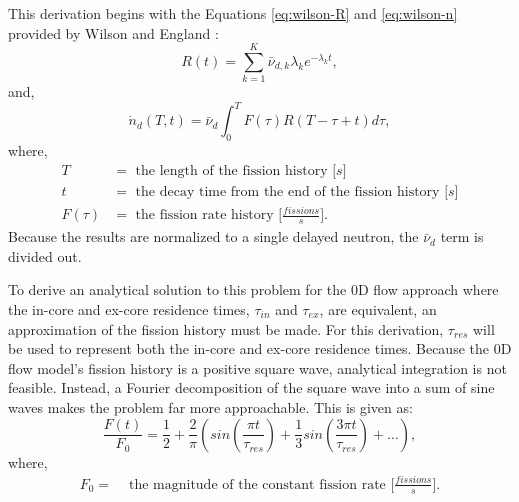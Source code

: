 \renewcommand{\theequation}{A\thechapter.\arabic{equation}}
\label{ref:appendixA}

This derivation begins with the Equations \eqref{eq:wilson-R} and \eqref{eq:wilson-n} provided by Wilson and England \cite{wilson2002delayed}:
\begin{equation}
    R(t) = \sum_{k=1}^{K} \bar{\nu}_{d, k} \lambda_k e^{-\lambda_k t},
    \label{eq:wilson-R}
\end{equation}
and,
\begin{equation}
    \dot{n}_d(T, t) = \bar{\nu}_d \int_{0}^{T} F(\tau) R(T-\tau+t) d\tau,
    \label{eq:wilson-n}
\end{equation}
where,
\begin{align}
T &= \mbox{ the length of the fission history [$s$]} \nonumber \\
t &= \mbox{ the decay time from the end of the fission history [$s$]} \nonumber \\
F(\tau) &= \mbox{ the fission rate history [$\frac{fissions}{s}$].} \nonumber
\end{align}
Because the results are normalized to a single delayed neutron, the $\bar{\nu}_d$ term is divided out.

To derive an analytical solution to this problem for the 0D flow approach where the in-core and ex-core residence times, $\tau_{in}$ and $\tau_{ex}$, are equivalent, an approximation of the fission history must be made.
For this derivation, $\tau_{res}$ will be used to represent both the in-core and ex-core residence times.
Because the 0D flow model's fission history is a positive square wave, analytical integration is not feasible.
Instead, a Fourier decomposition of the square wave into a sum of sine waves makes the problem far more approachable.
This is given as:
\begin{equation}
    \frac{F(t)}{F_0} = \frac{1}{2} + \frac{2}{\pi} \left(sin \left(\frac{\pi t}{\tau_{res}} \right) + \frac{1}{3} sin \left(\frac{3 \pi t}{\tau_{res}} \right) + \dots  \right),
    \label{eq:pos-square}
\end{equation}
where,
\begin{align}
    F_0 =& \text{ the magnitude of the constant fission rate [$\frac{fissions}{s}$].} \nonumber
\end{align}

